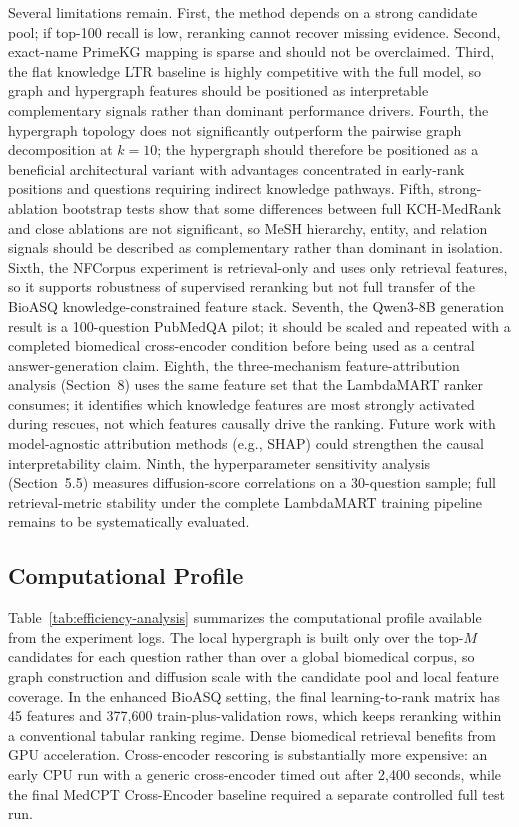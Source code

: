 Several limitations remain. First, the method depends on a strong candidate pool; if top-100 recall is low, reranking cannot recover missing evidence. Second, exact-name PrimeKG mapping is sparse and should not be overclaimed. Third, the flat knowledge LTR baseline is highly competitive with the full model, so graph and hypergraph features should be positioned as interpretable complementary signals rather than dominant performance drivers. Fourth, the hypergraph topology does not significantly outperform the pairwise graph decomposition at $k{=}10$; the hypergraph should therefore be positioned as a beneficial architectural variant with advantages concentrated in early-rank positions and questions requiring indirect knowledge pathways. Fifth, strong-ablation bootstrap tests show that some differences between full KCH-MedRank and close ablations are not significant, so MeSH hierarchy, entity, and relation signals should be described as complementary rather than dominant in isolation. Sixth, the NFCorpus experiment is retrieval-only and uses only retrieval features, so it supports robustness of supervised reranking but not full transfer of the BioASQ knowledge-constrained feature stack. Seventh, the Qwen3-8B generation result is a 100-question PubMedQA pilot; it should be scaled and repeated with a completed biomedical cross-encoder condition before being used as a central answer-generation claim. Eighth, the three-mechanism feature-attribution analysis (Section~8) uses the same feature set that the LambdaMART ranker consumes; it identifies which knowledge features are most strongly activated during rescues, not which features causally drive the ranking. Future work with model-agnostic attribution methods (e.g., SHAP) could strengthen the causal interpretability claim. Ninth, the hyperparameter sensitivity analysis (Section~5.5) measures diffusion-score correlations on a 30-question sample; full retrieval-metric stability under the complete LambdaMART training pipeline remains to be systematically evaluated.

\subsection{Computational Profile}



Table~\ref{tab:efficiency-analysis} summarizes the computational profile available from the experiment logs. The local hypergraph is built only over the top-$M$ candidates for each question rather than over a global biomedical corpus, so graph construction and diffusion scale with the candidate pool and local feature coverage. In the enhanced BioASQ setting, the final learning-to-rank matrix has 45 features and 377,600 train-plus-validation rows, which keeps reranking within a conventional tabular ranking regime. Dense biomedical retrieval benefits from GPU acceleration. Cross-encoder rescoring is substantially more expensive: an early CPU run with a generic cross-encoder timed out after 2,400 seconds, while the final MedCPT Cross-Encoder baseline required a separate controlled full test run.

